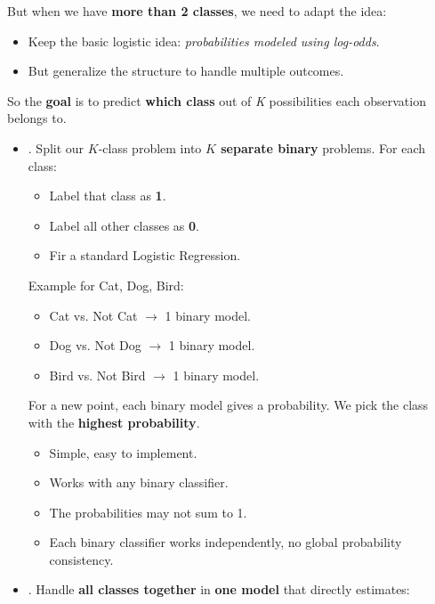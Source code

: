 \highspace
But when we have \textbf{more than 2 classes}, we need to adapt the idea:
\begin{itemize}
    \item Keep the basic logistic idea: \emph{probabilities modeled using log-odds}.
    \item But generalize the structure to handle multiple outcomes.
\end{itemize}
So the \textbf{goal} is to predict \textbf{which class} out of \emph{K} possibilities each observation belongs to.
\begin{itemize}
    \item {}. Split our $K$-class problem into \textbf{$K$ separate binary} problems. For each class:
    \begin{itemize}
        \item Label that class as \textbf{1}.
        \item Label all other classes as \textbf{0}.
        \item Fir a standard Logistic Regression.
    \end{itemize}
    Example for Cat, Dog, Bird:
    \begin{itemize}
        \item Cat vs. Not Cat $\rightarrow$ 1 binary model.
        \item Dog vs. Not Dog $\rightarrow$ 1 binary model.
        \item Bird vs. Not Bird $\rightarrow$ 1 binary model.
    \end{itemize}
    For a new point, each binary model gives a probability. We pick the class with the \textbf{highest probability}.
    \begin{itemize}
        \item[\textcolor{Green3}{\faIcon{check}}] Simple, easy to implement.
        \item[\textcolor{Green3}{\faIcon{check}}] Works with any binary classifier.
        \item[\textcolor{Red2}{\faIcon{times}}] The probabilities may not sum to 1.
        \item[\textcolor{Red2}{\faIcon{times}}] Each binary classifier works independently, no global probability consistency.
    \end{itemize}
    \item {}. Handle \textbf{all classes together} in \textbf{one model} that directly estimates:
    \begin{equation}

\end{equation}
\end{itemize}
